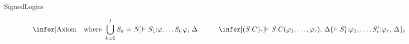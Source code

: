 \begin{entry}{SignedLogics}  


\begin{calculus}


\[
  \infer[\text{Axiom\quad where }\bigcup_{k=0}^lS_k=N]{\vdash S_1{:}\varphi,\ldots S_l{:}\varphi,\,\Delta}{}\bigskip
\qquad\quad
  \infer[(S{:}C)_r]{\vdash
    S{:}C(\varphi_1,\ldots,\varphi_r),\,\Delta}{\{\vdash S_1^i{:}\varphi_1,\ldots,S_r^i{:}\varphi_r,\,\Delta\}_i}
\]

\end{calculus}



\end{entry}
